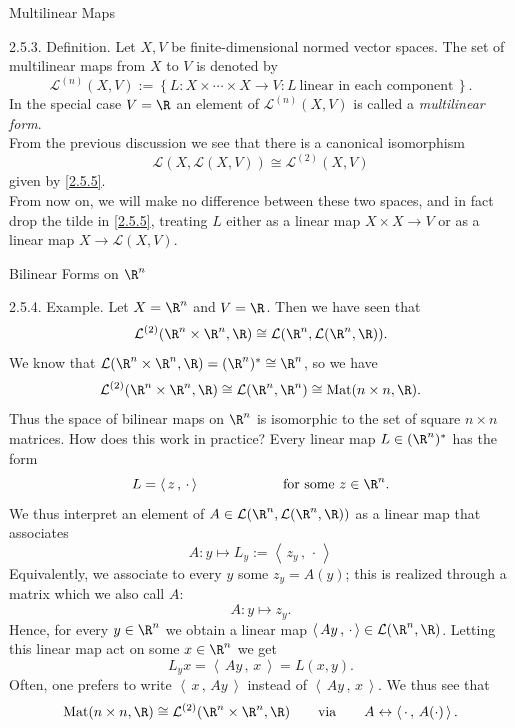 \documentclass[smaller,hyperref={CJKbookmarks=true}]{beamer}
\newcommand{\scp}[2]{\left\langle\,#1\,,\,#2\,\right\rangle} \newcommand{\scpp}{\langle\,\cdot\,,\,\cdot\,\rangle}
\begin{document}
\begin{frame}[t]{Multilinear Maps}
\begin{spacing}{1}
\alert{2.5.3. Definition.} Let $X, V$ be finite-dimensional normed vector spaces.
The set of multilinear maps from $X$ to $V$ is denoted by
\[\mathcal{L}^{(n)}(X,V):=\left\{L:
X\times\cdots\times X\to V:L~\text{linear in each component}\,\right\}.\]
In the special case $V=\R$ an element of $\mathcal{L}^{(n)}(X,V)$ is called a \emph{multilinear form}.\\[5pt]
From the previous discussion we see that there is a canonical isomorphism
\[\mathcal{L}(X,\mathcal{L}(X,V))\cong
\mathcal{L}^{(2)}(X,V)\]
given by \eqref{2.5.5}.\\[4pt]
From now on, we will make no dif{}ference between these two spaces, and in
fact drop the tilde in \eqref{2.5.5}, treating $L$ either as a linear map $X\times X\to V$ or as a linear map $X\to\mathcal{L}(X,V)$.
\end{spacing}
\end{frame}
\begin{frame}{Bilinear Forms on $\R^n$}
\begin{spacing}{1.05}
\vspace*{20pt}
\alert{2.5.4. Example.} Let $X=\R^n$ and $V=\R$. Then we have seen that
\[\mathcal{L}^{(2)}(\R^n\times\R^n,\R)\cong
\mathcal{L}(\R^n,\mathcal{L}(\R^n,\R)).\]
We know that $\mathcal{L}(\R^n\times\R^n,\R)=(\R^n)^*\cong
\R^n$, so we have
\begin{equation}\label{2.5.6}
  \mathcal{L}^{(2)}(\R^n\times\R^n,\R)\cong
  \mathcal{L}(\R^n,\R^n)\cong\text{Mat}(n\times n,\R).
\end{equation}
Thus the space of bilinear maps on $\R^n$ is isomorphic to the set of square $n\times n$ matrices. How does this work in practice? Every linear map $L\in(\R^n)^*$ has the form
\[L=\scp{z}{\cdot}\qquad\qquad\qquad
\text{for some}~z\in\R^n.\]
\newpage
We thus interpret an element of $A\in\mathcal{L}(\R^n,\mathcal{L}(\R^n,\R))$ as a linear map that associates
\begin{equation}\label{2.5.7}
  A:y\mapsto L_y:=\scp{z_y}{\cdot}
\end{equation}
Equivalently, we associate to every $y$ some $z_y=A(y)$; this is realized through a matrix which we also call $A$:
\begin{equation}\label{2.5.8}
  A:y\mapsto z_y.
\end{equation}
Hence, for every $y\in\R^n$ we obtain a linear map $\scp{Ay}{\cdot}\in\mathcal{L}(\R^n,\R)$. Letting this linear map act on some $x\in\R^n$ we get
\[L_yx=\scp{Ay}{x}=L(x,y).\]
Often, one prefers to write $\scp{x}{Ay}$ instead of $\scp{Ay}{x}$. We thus see that
\[\text{Mat}(n\times n,\R)\cong\mathcal{L}^{(2)}(\R^n\times\R^n,\R)\qquad
\text{via}\qquad A\leftrightarrow\scp{\cdot}{A(\cdot)}.\]
\end{spacing}
\end{frame}
\end{document}
